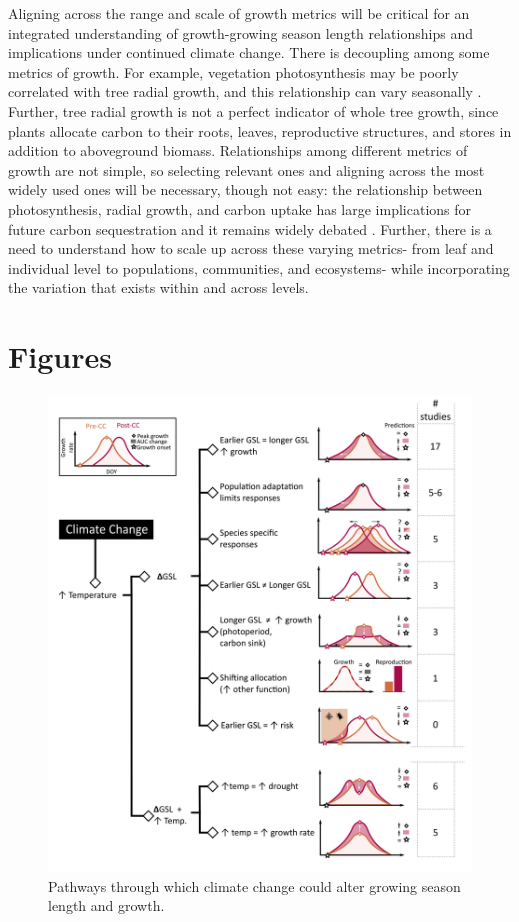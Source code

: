 \documentclass[11pt]{article}
\begin{document}
Aligning across the range and scale of growth metrics will be critical for an integrated understanding of growth-growing season length relationships and implications under continued climate change.  There is decoupling among some metrics of growth. For example, vegetation photosynthesis may be poorly correlated with tree radial growth, and this relationship can vary seasonally \citep{cabon2022cross}. Further, tree radial growth is not a perfect indicator of whole tree growth, since plants allocate carbon to their roots, leaves, reproductive structures, and stores in addition to aboveground biomass. Relationships among different metrics of growth are not simple, so selecting relevant ones and aligning across the most widely used ones will be necessary, though not easy: the relationship  between photosynthesis, radial growth, and carbon uptake has large implications for future carbon sequestration and it remains widely debated \citep{green2022limits}. Further, there is a need to understand how to scale up across these varying metrics- from leaf and individual level to populations, communities, and ecosystems- while incorporating the variation that exists within and across levels.


\newpage
\section{Figures}


\clearpage
\begin{figure}[h!]
\includegraphics[width=1\textwidth]{..//figures/hypothesesconceptfig.png}
\caption{Pathways through which climate change could alter growing season length and growth.}
\label{fig:hypotheses}
\end{figure}
\end{document}
